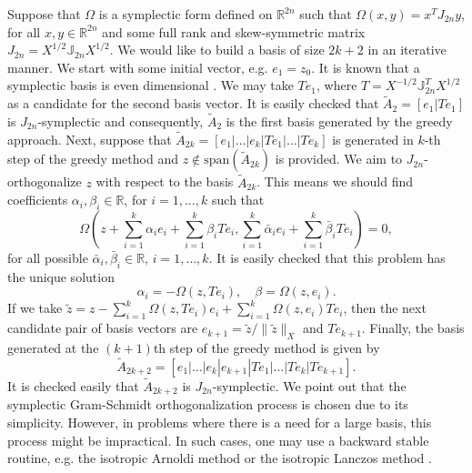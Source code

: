 Suppose that $\Omega$ is a symplectic form defined on $\mathbb R^{2n}$ such that $\Omega(x,y) = x^T J_{2n} y$, for all $x,y\in \mathbb R^{2n}$ and some full rank and skew-symmetric matrix $J_{2n} = X^{1/2} \mathbb J_{2n} X^{1/2}$. We would like to build a basis of size $2k+2$ in an iterative manner. We start with some initial vector, e.g. $e_1 = z_0$. It is known that a symplectic basis is even dimensional \cite{Marsden:2010:IMS:1965128}. We may take $Te_1$, where $T = X^{-1/2} \mathbb J_{2n}^{T}X^{1/2}$ as a candidate for the second basis vector. It is easily checked that $\tilde A_2=[e_1|Te_1]$ is $J_{2n}$-symplectic and consequently, $\tilde A_2$ is the first basis generated by the greedy approach. Next, suppose that $\tilde A_{2k} = [e_1|\dots|e_k|Te_1|\dots|Te_k]$ is generated in $k$-th step of the greedy method and $z\not \in \text{span}\left(\tilde A_{2k}\right)$ is provided. We aim to $J_{2n}$-orthogonalize $z$ with respect to the basis $\tilde A_{2k}$. This means we should find coefficients $\alpha_i,\beta_i\in \mathbb R$, for $i=1,\dots,k$ such that
\begin{equation} \label{eq:normmor.9}
	\Omega\left( z +\sum_{i=1}^{k} \alpha_i e_i +\sum_{i=1}^{k} \beta_i Te_i, \sum_{i=1}^{k}\bar \alpha_i e_i +\sum_{i=1}^{k} \bar \beta_i Te_i \right) = 0,
\end{equation}
for all possible $\bar \alpha_i,\bar \beta_i \in \mathbb R$, $i=1,\dots,k$. It is easily checked that this problem has the unique solution
\begin{equation} \label{eq:normmor.10}
	\alpha_i = - \Omega(z,Te_i), \quad \beta = \Omega(z,e_i).
\end{equation}
If we take $\tilde z = z -\sum_{i=1}^{k} \Omega(z,Te_i) e_i +\sum_{i=1}^{k} \Omega(z,e_i) Te_i$, then the next candidate pair of basis vectors are $e_{k+1} = \tilde z / \| \tilde z \|_X$ and $Te_{k+1}$. Finally, the basis generated at the $(k+1)$th step of the greedy method is given by
\begin{equation} \label{eq:normmor.11}
	\tilde A_{2k+2} = [e_1|\dots|e_k|e_{k+1}|Te_1|\dots|Te_k|Te_{k+1}].
\end{equation}
It is checked easily that $\tilde A_{2k+2}$ is $J_{2n}$-symplectic. We point out that the symplectic Gram-Schmidt orthogonalization process is chosen due to its simplicity. However, in problems where there is a need for a large basis, this process might be impractical. In such cases, one may use a backward stable routine, e.g. the isotropic Arnoldi method or the isotropic Lanczos method \cite{doi:10.1137/S1064827500366434}.

